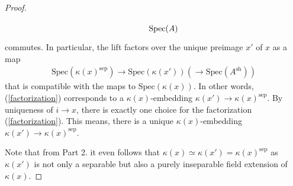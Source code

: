 \documentclass[leqno]{article}
\renewcommand{\Spec}{\mathrm{Spec}}
\begin{document}
\begin{proof}
\begin{itemize}
\[\begin{tikzcd}[row sep=small]
     & \Spec(A)
  \end{tikzcd}
    \]
commutes.
In particular, the lift factors over the unique preimage $x'$ of $x$ as a map
\begin{align}\label{factorization}
\Spec(\kappa(x)^{\mathrm{sep}})\rightarrow \Spec(\kappa(x'))(\rightarrow \Spec(A^{\mathrm{sh}}))
\end{align} 
that is compatible with the maps to $\Spec(\kappa(x))$.
In other words, (\ref{factorization}) corresponds to a $\kappa(x)$-embedding $\kappa(x')\rightarrow \kappa(x)^{\mathrm{sep}}$.
By uniqueness of $i\rightarrow x$, there is exactly one choice for the factorization (\ref{factorization}).
This means, there is a unique $\kappa(x)$-embedding $\kappa(x')\rightarrow \kappa(x)^{\mathrm{sep}}$. 
\end{itemize}
Note that from Part 2. it even follows that $\kappa(x)\simeq\kappa(x')=\kappa(x)^{\mathrm{sep}}$ as $\kappa(x')$ is not only a separable but also a purely inseparable field extension of $\kappa(x)$.
\end{proof}
%
\end{document}
